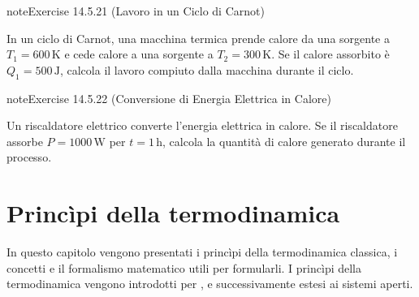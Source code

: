 \documentclass[letterpaper,10pt,italian]{jupyterBook}
\begin{document}
\begin{sphinxadmonition}{note}{Exercise 14.5.21 (Lavoro in un Ciclo di Carnot)}



\sphinxAtStartPar
In un ciclo di Carnot, una macchina termica prende calore da una sorgente a \(T_1 = 600 \, \text{K}\) e cede calore a una sorgente a \(T_2 = 300 \, \text{K}\). Se il calore assorbito è \(Q_1 = 500 \, \text{J}\), calcola il lavoro compiuto dalla macchina durante il ciclo.
\end{sphinxadmonition}
 \label{exercise:ch/thermodynamics/foundation-problems-exercise-21}

\begin{sphinxadmonition}{note}{Exercise 14.5.22 (Conversione di Energia Elettrica in Calore)}



\sphinxAtStartPar
Un riscaldatore elettrico converte l’energia elettrica in calore. Se il riscaldatore assorbe \(P = 1000 \, \text{W}\) per \(t = 1 \, \text{h}\), calcola la quantità di calore generato durante il processo.
\end{sphinxadmonition}

\sphinxstepscope


\chapter{Princìpi della termodinamica}
\label{\detokenize{ch/thermodynamics/principles:principi-della-termodinamica}}\label{\detokenize{ch/thermodynamics/principles:physics-hs-thermodynamics-principles}}\label{\detokenize{ch/thermodynamics/principles::doc}}
\sphinxAtStartPar
In questo capitolo vengono presentati i princìpi della termodinamica classica, i concetti e il formalismo matematico utili per formularli.
I princìpi della termodinamica vengono introdotti per , e successivamente estesi ai sistemi aperti.
\end{document}
